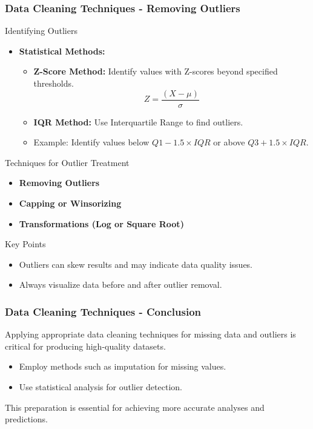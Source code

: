 \documentclass[aspectratio=169]{beamer}
\begin{document}
\begin{frame}[fragile]
    \frametitle{Data Cleaning Techniques - Removing Outliers}
    \begin{block}{Identifying Outliers}
        \begin{itemize}
            \item \textbf{Statistical Methods:}
            \begin{itemize}
                \item \textbf{Z-Score Method:} Identify values with Z-scores beyond specified thresholds.
                \begin{equation}
                    Z = \frac{(X - \mu)}{\sigma}
                \end{equation}
                \item \textbf{IQR Method:} Use Interquartile Range to find outliers.
                \item Example: Identify values below \( Q1 - 1.5 \times IQR \) or above \( Q3 + 1.5 \times IQR \).
            \end{itemize}
        \end{itemize}
    \end{block}
  
    \begin{block}{Techniques for Outlier Treatment}
        \begin{itemize}
            \item \textbf{Removing Outliers}
            \item \textbf{Capping or Winsorizing}
            \item \textbf{Transformations (Log or Square Root)}
        \end{itemize}
    \end{block}

    \begin{block}{Key Points}
        \begin{itemize}
            \item Outliers can skew results and may indicate data quality issues.
            \item Always visualize data before and after outlier removal.
        \end{itemize}
    \end{block}
\end{frame}

\begin{frame}[fragile]
    \frametitle{Data Cleaning Techniques - Conclusion}
    Applying appropriate data cleaning techniques for missing data and outliers is critical for producing high-quality datasets. 

    \begin{itemize}
        \item Employ methods such as imputation for missing values.
        \item Use statistical analysis for outlier detection.
    \end{itemize}

    This preparation is essential for achieving more accurate analyses and predictions.
\end{frame}
\end{document}
